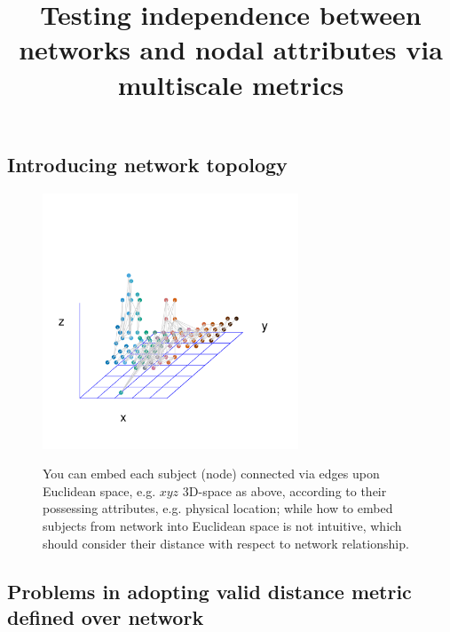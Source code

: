 \documentclass[12pt]{article}
\begin{document}
	
	\title{Testing independence between networks and nodal attributes via multiscale metrics}	
		
\subsection*{Introducing network topology}

\begin{figure}[H]
	\centering
	\includegraphics[width=3in]{../Figure/intro.pdf}	
	\label{fig:intro}
	\caption{You can embed each subject (node) connected via edges upon Euclidean space, e.g. $xyz$ 3D-space as above, according to their possessing attributes, e.g. physical location; while how to embed subjects from network into Euclidean space is not intuitive, which should consider their distance with respect to network relationship.}
\end{figure}



\subsection*{Problems in adopting  valid distance metric defined over network}
\end{document}
